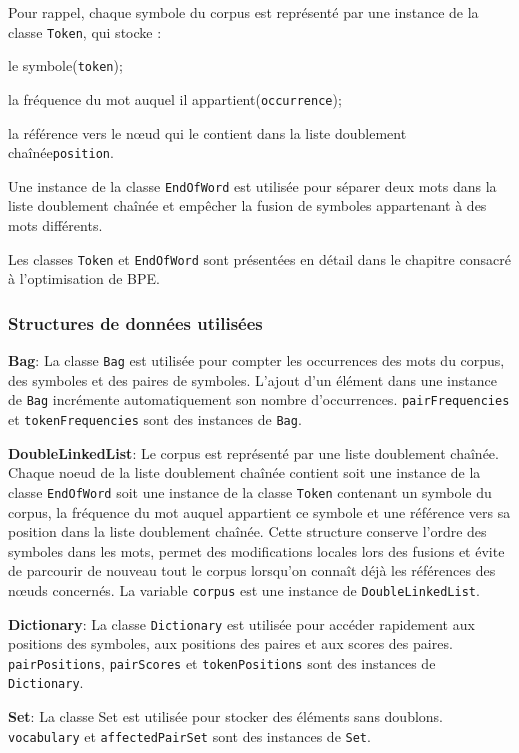 \documentclass[12pt,a4paper]{report}
\begin{document}
	Pour rappel, chaque symbole du corpus est représenté par une instance de la classe \texttt{Token}, qui stocke :
	
	\begin{itemizeFB}
		\item le symbole(\texttt{token});
		
		\item la fréquence du mot auquel il appartient(\texttt{occurrence});
		
		\item la référence vers le nœud qui le contient dans la liste doublement chaînée\texttt{position}.
	\end{itemizeFB}
	
	Une instance de la classe \texttt{EndOfWord} est utilisée pour séparer deux mots dans la liste doublement chaînée et empêcher la fusion de symboles appartenant à des mots différents.
	
	Les classes \texttt{Token} et \texttt{EndOfWord} sont présentées en détail dans le chapitre consacré à l’optimisation de BPE.
	
	\subsubsection{Structures de données utilisées}
	
	\begin{itemizeFB}
		\item \textbf{Bag}: La classe \texttt{Bag} est utilisée pour compter les occurrences des mots du corpus, des symboles et des paires de symboles. L’ajout d’un élément dans une instance de \texttt{Bag} incrémente automatiquement son nombre d’occurrences.
		\texttt{pairFrequencies} et \texttt{tokenFrequencies} sont des instances de \texttt{Bag}.
		
		\item \textbf{DoubleLinkedList}: Le corpus est représenté par une liste doublement chaînée. Chaque noeud de la liste doublement chaînée contient soit une instance de la classe \texttt{EndOfWord} soit une instance de la classe \texttt{Token} contenant un symbole du corpus, la fréquence du mot auquel appartient ce symbole et une référence vers sa position dans la liste doublement chaînée.
		Cette structure conserve l’ordre des symboles dans les mots, permet des modifications locales lors des fusions et évite de parcourir de nouveau tout le corpus lorsqu’on connaît déjà les références des nœuds concernés.
		La variable \texttt{corpus} est une instance de \texttt{DoubleLinkedList}.
		
		\item \textbf{Dictionary}: La classe \texttt{Dictionary} est utilisée pour accéder rapidement aux positions des symboles, aux positions des paires et aux scores des paires.
		\texttt{pairPositions}, \texttt{pairScores} et \texttt{tokenPositions} sont des instances de \texttt{Dictionary}.
		
		\item \textbf{Set}: La classe Set est utilisée pour stocker des éléments sans doublons. \texttt{vocabulary} et \texttt{affectedPairSet} sont des instances de \texttt{Set}.
	\end{itemizeFB}
	
\end{document}
